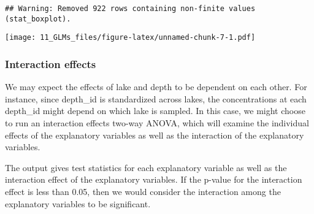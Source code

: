 \documentclass[]{article}
\newenvironment{Shaded}{\begin{snugshade}}{\end{snugshade}}
\newcommand{\KeywordTok}[1]{\textcolor[rgb]{0.13,0.29,0.53}{\textbf{#1}}}
\newcommand{\StringTok}[1]{\textcolor[rgb]{0.31,0.60,0.02}{#1}}
\newcommand{\CommentTok}[1]{\textcolor[rgb]{0.56,0.35,0.01}{\textit{#1}}}
\newcommand{\OperatorTok}[1]{\textcolor[rgb]{0.81,0.36,0.00}{\textbf{#1}}}
\newcommand{\NormalTok}[1]{#1}
\begin{document}
\begin{verbatim}
## Warning: Removed 922 rows containing non-finite values (stat_boxplot).
\end{verbatim}

\texttt{[image: 11\_GLMs\_files/figure-latex/unnamed-chunk-7-1.pdf]}

\subsubsection{Interaction effects}\label{interaction-effects}

We may expect the effects of lake and depth to be dependent on each
other. For instance, since depth\_id is standardized across lakes, the
concentrations at each depth\_id might depend on which lake is sampled.
In this case, we might choose to run an interaction effects two-way
ANOVA, which will examine the individual effects of the explanatory
variables as well as the interaction of the explanatory variables.

The output gives test statistics for each explanatory variable as well
as the interaction effect of the explanatory variables. If the p-value
for the interaction effect is less than 0.05, then we would consider the
interaction among the explanatory variables to be significant.

\begin{Shaded}
\end{Shaded}
\end{document}
